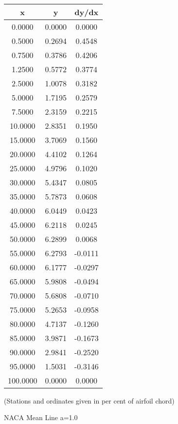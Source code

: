 \documentclass[11pt]{book}
\begin{document}
 \vspace{8mm}
 \begin{tabular}{|c|c|c|}  \hline
 x & y & dy/dx \\
 \hline
0.0000 & 0.0000 & 0.0000 \\
0.5000 & 0.2694 & 0.4548 \\
0.7500 & 0.3786 & 0.4206 \\
1.2500 & 0.5772 & 0.3774 \\
2.5000 & 1.0078 & 0.3182 \\
5.0000 & 1.7195 & 0.2579 \\
7.5000 & 2.3159 & 0.2215 \\
10.0000 & 2.8351 & 0.1950 \\
15.0000 & 3.7069 & 0.1560 \\
20.0000 & 4.4102 & 0.1264 \\
25.0000 & 4.9796 & 0.1020 \\
30.0000 & 5.4347 & 0.0805 \\
35.0000 & 5.7873 & 0.0608 \\
40.0000 & 6.0449 & 0.0423 \\
45.0000 & 6.2118 & 0.0245 \\
50.0000 & 6.2899 & 0.0068 \\
55.0000 & 6.2793 & -0.0111 \\
60.0000 & 6.1777 & -0.0297 \\
65.0000 & 5.9808 & -0.0494 \\
70.0000 & 5.6808 & -0.0710 \\
75.0000 & 5.2653 & -0.0958 \\
80.0000 & 4.7137 & -0.1260 \\
85.0000 & 3.9871 & -0.1673 \\
90.0000 & 2.9841 & -0.2520 \\
95.0000 & 1.5031 & -0.3146 \\
100.0000 & 0.0000 & 0.0000 \\
 \hline
 \end{tabular}
 \vspace{8mm}

(Stations and ordinates given in per cent of airfoil chord)

 \newpage
 \label{mla=1.0}
 \begin{Large}
 NACA Mean Line a=1.0
 \end{Large}
  
\end{document}
